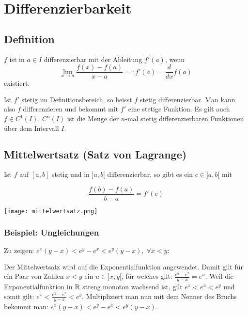 \section{Differenzierbarkeit}
\subsection{Definition}
$f$ ist in $a \in I$ differenzierbar mit der Ableitung $f'(a)$, wenn
\[
\lim_{x \to a} \frac{f(x) - f(a)}{x - a} =: f'(a) = \frac{d}{dx}f(a)
\]
existiert.

Ist $f'$ stetig im Definitionsbereich, so heisst $f$ stetig differenzierbar. Man
kann also $f$ differenzieren und bekommt mit $f'$ eine stetige Funktion. Es gilt
auch $f \in C^1(I)$. $C^n(I)$ ist die Menge der $n$-mal stetig differenzierbaren
Funktionen über dem Intervall $I$.

\subsection{Mittelwertsatz (Satz von Lagrange)}
Ist $f$ auf $[a,b]$ stetig und in $]a, b[$ differenzierbar, so gibt es ein $c
\in ]a,b[$ mit\\

\begin{minipage}{0.25\textwidth}
	\vspace{0pt}
	\[
	\frac{f(b) - f(a)}{b-a} = f'(c)
	\]
\end{minipage}
\begin{minipage}{0.25\textwidth}
		\vspace{0pt}
	\texttt{[image: mittelwertsatz.png]}
\end{minipage}

\subsubsection{Beispiel: Ungleichungen}
Zu zeigen: $e^x(y-x) < e^y - e^x < e^y(y-x), \; \forall x < y$:


Der Mittelwertsatz wird auf die Exponentialfunktion angewendet. Damit gilt für
ein Paar von Zahlen $x < y$ ein $u \in ]x,y[$, für welches gilt: $\frac{e^y
- e^x}{y-x} = e^u$. Weil die Exponentialfunktion in $\mathbb{R}$ streng monoton wachsend
ist, gilt $e^x < e^u < e^y$ und somit gilt: $e^x < \frac{e^y-e^x}{y-x} < e^y$.
Multipliziert man nun mit dem Nenner des Bruchs bekommt man: $e^x (y-x) < e^y -
e^x < e^y(y-x)$.

